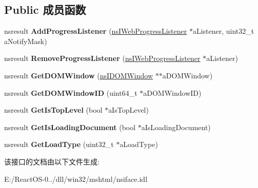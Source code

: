 \subsection*{Public 成员函数}
\begin{DoxyCompactItemize}
\item 
\mbox{\label{interfacens_i_web_progress_a3738cbf3b90fefc07fa7c6c705818a7c}} 
nsresult {\bfseries Add\+Progress\+Listener} (\hyperlink{interfacens_i_supports}{ns\+I\+Web\+Progress\+Listener} $\ast$a\+Listener, uint32\+\_\+t a\+Notify\+Mask)
\item 
\mbox{\label{interfacens_i_web_progress_a40c5a3b41c8d254c96d06fcfa32c6d51}} 
nsresult {\bfseries Remove\+Progress\+Listener} (\hyperlink{interfacens_i_supports}{ns\+I\+Web\+Progress\+Listener} $\ast$a\+Listener)
\item 
\mbox{\label{interfacens_i_web_progress_a3701ea4ab8461bc339afd0d37d47f5b6}} 
nsresult {\bfseries Get\+D\+O\+M\+Window} (\hyperlink{interfacens_i_d_o_m_window}{ns\+I\+D\+O\+M\+Window} $\ast$$\ast$a\+D\+O\+M\+Window)
\item 
\mbox{\label{interfacens_i_web_progress_a506c0accfc81122d10343c09eeb36c3b}} 
nsresult {\bfseries Get\+D\+O\+M\+Window\+ID} (uint64\+\_\+t $\ast$a\+D\+O\+M\+Window\+ID)
\item 
\mbox{\label{interfacens_i_web_progress_af6422d5aa6bb0aa5cd6a6544d044b6b6}} 
nsresult {\bfseries Get\+Is\+Top\+Level} (bool $\ast$a\+Is\+Top\+Level)
\item 
\mbox{\label{interfacens_i_web_progress_a6a3f76225718964819f0244e424a94c3}} 
nsresult {\bfseries Get\+Is\+Loading\+Document} (bool $\ast$a\+Is\+Loading\+Document)
\item 
\mbox{\label{interfacens_i_web_progress_a0b72a53541c077bbb1fd7e19b80f02ed}} 
nsresult {\bfseries Get\+Load\+Type} (uint32\+\_\+t $\ast$a\+Load\+Type)
\end{DoxyCompactItemize}


该接口的文档由以下文件生成\+:\begin{DoxyCompactItemize}
\item 
E\+:/\+React\+O\+S-\/0../dll/win32/mshtml/nsiface.\+idl\end{DoxyCompactItemize}
